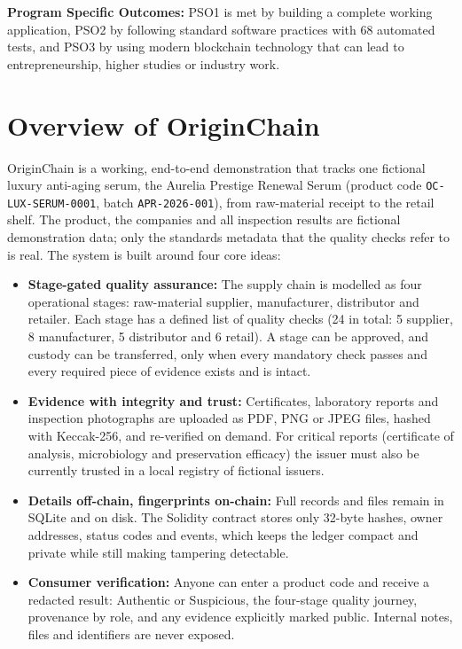 \documentclass[12pt,a4paper]{report}
\begin{document}
\vspace{0.3cm}
\noindent \textbf{Program Specific Outcomes:} PSO1 is met by building a complete working application, PSO2 by following standard software practices with 68 automated tests, and PSO3 by using modern blockchain technology that can lead to entrepreneurship, higher studies or industry work.

\section{Overview of OriginChain}
OriginChain is a working, end-to-end demonstration that tracks one fictional luxury anti-aging serum, the Aurelia Prestige Renewal Serum (product code \texttt{OC-LUX-SERUM-0001}, batch \texttt{APR-2026-001}), from raw-material receipt to the retail shelf. The product, the companies and all inspection results are fictional demonstration data; only the standards metadata that the quality checks refer to is real. The system is built around four core ideas:
\begin{itemize}[leftmargin=1.5em]
    \item \textbf{Stage-gated quality assurance:} The supply chain is modelled as four operational stages: raw-material supplier, manufacturer, distributor and retailer. Each stage has a defined list of quality checks (24 in total: 5 supplier, 8 manufacturer, 5 distributor and 6 retail). A stage can be approved, and custody can be transferred, only when every mandatory check passes and every required piece of evidence exists and is intact.
    \item \textbf{Evidence with integrity and trust:} Certificates, laboratory reports and inspection photographs are uploaded as PDF, PNG or JPEG files, hashed with Keccak-256, and re-verified on demand. For critical reports (certificate of analysis, microbiology and preservation efficacy) the issuer must also be currently trusted in a local registry of fictional issuers.
    \item \textbf{Details off-chain, fingerprints on-chain:} Full records and files remain in SQLite and on disk. The Solidity contract stores only 32-byte hashes, owner addresses, status codes and events, which keeps the ledger compact and private while still making tampering detectable.
    \item \textbf{Consumer verification:} Anyone can enter a product code and receive a redacted result: Authentic or Suspicious, the four-stage quality journey, provenance by role, and any evidence explicitly marked public. Internal notes, files and identifiers are never exposed.
\end{itemize}
\end{document}
